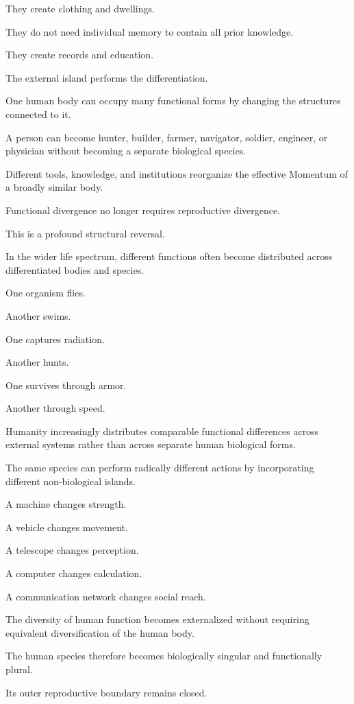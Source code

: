 They create clothing and dwellings.

They do not need individual memory to contain all prior knowledge.

They create records and education.

The external island performs the differentiation.

One human body can occupy many functional forms by changing the structures connected to it.

A person can become hunter, builder, farmer, navigator, soldier, engineer, or physician without becoming a separate biological species.

Different tools, knowledge, and institutions reorganize the effective Momentum of a broadly similar body.

Functional divergence no longer requires reproductive divergence.

This is a profound structural reversal.

In the wider life spectrum, different functions often become distributed across differentiated bodies and species.

One organism flies.

Another swims.

One captures radiation.

Another hunts.

One survives through armor.

Another through speed.

Humanity increasingly distributes comparable functional differences across external systems rather than across separate human biological forms.

The same species can perform radically different actions by incorporating different non-biological islands.

A machine changes strength.

A vehicle changes movement.

A telescope changes perception.

A computer changes calculation.

A communication network changes social reach.

The diversity of human function becomes externalized without requiring equivalent diversification of the human body.

The human species therefore becomes biologically singular and functionally plural.

Its outer reproductive boundary remains closed.


